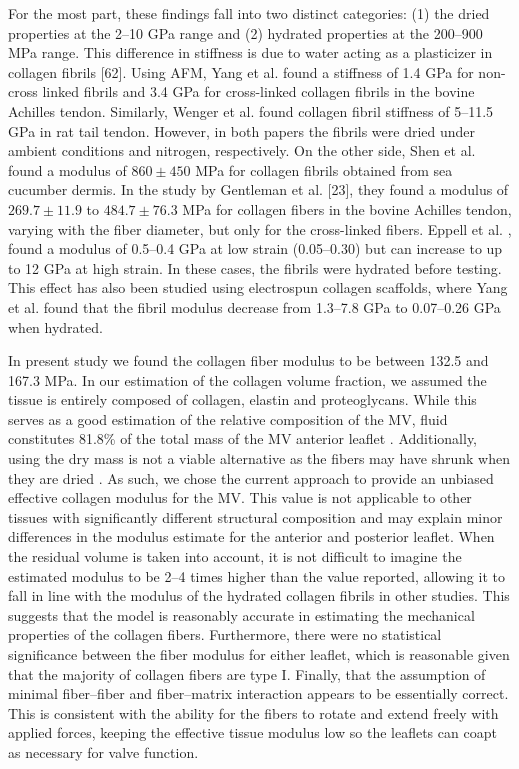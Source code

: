     For the most part, these findings fall into two distinct categories: (1) the dried properties at the 2–10 GPa range and (2) hydrated properties at the 200–900 MPa range. This difference in stiffness is due to water acting as a plasticizer in collagen fibrils [62]. Using AFM, Yang et al. \cite{yang_micromechanical_2007} found a stiffness of 1.4 GPa for non-cross linked fibrils and 3.4 GPa for cross-linked collagen fibrils in the bovine Achilles tendon. Similarly, Wenger et al. \cite{wenger_mechanical_2007} found collagen fibril stiffness of 5–11.5 GPa in rat tail tendon. However, in both papers the fibrils were dried under ambient conditions and nitrogen, respectively. On the other side, Shen et al. \cite{shen_stress_2008} found a modulus of $860\pm450$ MPa for collagen fibrils obtained from sea cucumber dermis. In the study by Gentleman et al. [23], they found a modulus of $269.7\pm11.9$ to $484.7\pm76.3$ MPa for collagen fibers in the bovine Achilles tendon, varying with the fiber diameter, but only for the cross-linked fibers. Eppell et al. \cite{eppell_nano_2006}, found a modulus of 0.5–0.4 GPa at low strain (0.05–0.30) but can increase to up to 12 GPa at high strain. In these cases, the fibrils were hydrated before testing. This effect has also been studied using electrospun collagen scaffolds, where Yang et al. found that the fibril modulus decrease from 1.3–7.8 GPa to 0.07–0.26 GPa when hydrated\cite{yang_mechanical_2008}.


    In present study we found the collagen fiber modulus to be between 132.5 and 167.3 MPa. In our estimation of the collagen volume fraction, we assumed the tissue is entirely composed of collagen, elastin and proteoglycans. While this serves as a good estimation of the relative composition of the MV, fluid constitutes 81.8\% of the total mass of the MV anterior leaflet \cite{lis_biochemical_1987}. Additionally, using the dry mass is not a viable alternative as the fibers may have shrunk when they are dried \cite{leikin_raman_1997}. As such, we chose the current approach to provide an unbiased effective collagen modulus for the MV. This value is not applicable to other tissues with significantly different structural composition and may explain minor differences in the modulus estimate for the anterior and posterior leaflet. When the residual volume is taken into account, it is not difficult to imagine the estimated modulus to be 2–4 times higher than the value reported, allowing it to fall in line with the modulus of the hydrated collagen fibrils in other studies. This suggests that the model is reasonably accurate in estimating the mechanical properties of the collagen fibers. Furthermore, there were no statistical significance between the fiber modulus for either leaflet, which is reasonable given that the majority of collagen fibers are type I. Finally, that the assumption of minimal fiber–fiber and fiber–matrix interaction appears to be essentially correct. This is consistent with the ability for the fibers to rotate and extend freely with applied forces, keeping the effective tissue modulus low so the leaflets can coapt as necessary for valve function.
    
